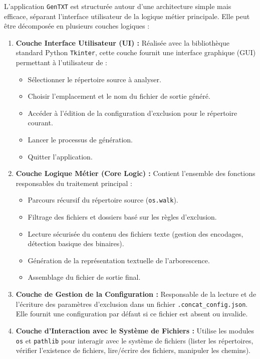 \documentclass[11pt, a4paper]{article}
\begin{document}
L'application \texttt{GenTXT} est structurée autour d'une architecture simple mais efficace, séparant l'interface utilisateur de la logique métier principale. Elle peut être décomposée en plusieurs couches logiques :

\begin{enumerate}
    \item \textbf{Couche Interface Utilisateur (UI) :} Réalisée avec la bibliothèque standard Python \texttt{Tkinter}, cette couche fournit une interface graphique (GUI) permettant à l'utilisateur de :
        \begin{itemize}
            \item Sélectionner le répertoire source à analyser.
            \item Choisir l'emplacement et le nom du fichier de sortie généré.
            \item Accéder à l'édition de la configuration d'exclusion pour le répertoire courant.
            \item Lancer le processus de génération.
            \item Quitter l'application.
        \end{itemize}
    \item \textbf{Couche Logique Métier (Core Logic) :} Contient l'ensemble des fonctions responsables du traitement principal :
        \begin{itemize}
            \item Parcours récursif du répertoire source (\texttt{os.walk}).
            \item Filtrage des fichiers et dossiers basé sur les règles d'exclusion.
            \item Lecture sécurisée du contenu des fichiers texte (gestion des encodages, détection basique des binaires).
            \item Génération de la représentation textuelle de l'arborescence.
            \item Assemblage du fichier de sortie final.
        \end{itemize}
    \item \textbf{Couche de Gestion de la Configuration :} Responsable de la lecture et de l'écriture des paramètres d'exclusion dans un fichier \texttt{.concat\_config.json}. Elle fournit une configuration par défaut si ce fichier est absent ou invalide.
    \item \textbf{Couche d'Interaction avec le Système de Fichiers :} Utilise les modules \texttt{os} et \texttt{pathlib} pour interagir avec le système de fichiers (lister les répertoires, vérifier l'existence de fichiers, lire/écrire des fichiers, manipuler les chemins).
\end{enumerate}
\end{document}
